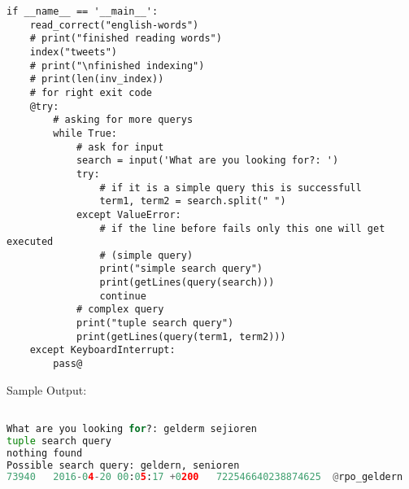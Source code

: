 \documentclass[12pt,pdftex,a4paper]{article}
\begin{document}
\begin{lstlisting}[style=base]
if __name__ == '__main__':
    read_correct("english-words")
    # print("finished reading words")
    index("tweets")
    # print("\nfinished indexing")
    # print(len(inv_index))
    # for right exit code
    @try:
        # asking for more querys
        while True:
            # ask for input
            search = input('What are you looking for?: ')
            try:
                # if it is a simple query this is successfull
                term1, term2 = search.split(" ")
            except ValueError:
                # if the line before fails only this one will get executed
                # (simple query)
                print("simple search query")
                print(getLines(query(search)))
                continue
            # complex query
            print("tuple search query")
            print(getLines(query(term1, term2)))
    except KeyboardInterrupt:
        pass@

\end{lstlisting}

Sample Output:
\begin{lstlisting}[language=Python,style=output]

What are you looking for?: gelderm sejioren
tuple search query
nothing found
Possible search query: geldern, senioren
73940	2016-04-20 00:05:17 +0200	722546640238874625	@rpo_geldern	RP Online Geldern	Geldern - Senioren machen eine Reise zurück in die Kinderzeit https://t.co/57qoWYf6LO

\end{lstlisting}
\end{document}
